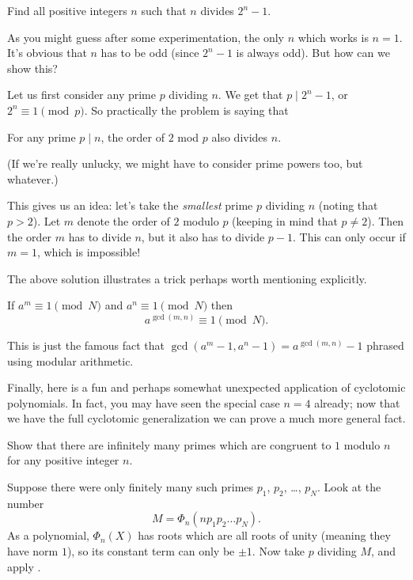 \documentclass[11pt]{scrartcl}
\begin{document}
\begin{example}[Folklore]
  Find all positive integers $n$ such that $n$ divides $2^n-1$.
\end{example}
\begin{soln}
  As you might guess after some experimentation, the only $n$ which works is $n=1$.
  It's obvious that $n$ has to be odd (since $2^n-1$ is always odd).
  But how can we show this?

  Let us first consider any prime $p$ dividing $n$.
  We get that $p \mid 2^n-1$, or $2^n \equiv 1 \pmod p$.
  So practically the problem is saying that
  \begin{center}
    For any prime $p \mid n$, the order of $2$ mod $p$ also divides $n$.
  \end{center}
  (If we're really unlucky, we might have to consider prime powers too, but whatever.)

  This gives us an idea: let's take the \emph{smallest} prime $p$ dividing $n$ (noting that $p>2$).
  Let $m$ denote the order of $2$ modulo $p$ (keeping in mind that $p \neq 2$).
  Then the order $m$ has to divide $n$, but it also has to divide $p-1$.
  This can only occur if $m=1$, which is impossible!
\end{soln}
The above solution illustrates a trick perhaps worth mentioning explicitly.
\begin{lemma}
  If $a^m \equiv 1 \pmod N$ and $a^n \equiv 1 \pmod N$
  then \[ a^{\gcd(m,n)} \equiv 1 \pmod N. \]
\end{lemma}
This is just the famous fact that $\gcd(a^m-1,a^n-1)=a^{\gcd(m,n)}-1$
phrased using modular arithmetic.

Finally, here is a fun and perhaps somewhat unexpected application of cyclotomic polynomials. In fact, you may have seen the special case $n=4$ already; now that we have the full cyclotomic generalization we can prove a much more general fact.
\begin{example}
  Show that there are infinitely many primes which are congruent to $1$ modulo $n$ for any positive integer $n$.
\end{example}
\begin{soln}
  Suppose there were only finitely many such primes $p_1$, $p_2$, \dots, $p_N$.
  Look at the number
  \[ M = \Phi_n(np_1p_2 \dots p_N). \]
  As a polynomial, $\Phi_n(X)$ has roots which are all roots of unity (meaning they have norm $1$),
  so its constant term can only be $\pm 1$.
  Now take $p$ dividing $M$, and apply .
\end{soln}
\end{document}
